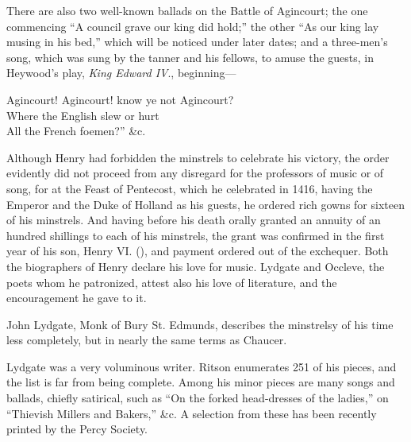 There are also two well-known ballads on the Battle of Agincourt; the one
commencing “A council grave our king did hold;” the other “As our king lay
musing in his bed,” which will be noticed under later dates; and a three-men’s
song, which was sung by the tanner and his fellows, to amuse the guests, in
Heywood’s play, \textit{King Edward IV}., beginning—

\settowidth{\versewidth}{Agincourt! Agincourt! know ye not Agincourt?}
\begin{scverse}Agincourt! Agincourt! know ye not Agincourt?\\
Where the English slew or hurt\\
\vin All the French foemen?” \&c.
\end{scverse}

Although Henry had forbidden the minstrels to celebrate his victory, the order
evidently did not proceed from any disregard for the professors of music or of
song, for at the Feast of Pentecost, which he celebrated in 1416, having the
Emperor and the Duke of Holland as his guests, he ordered rich gowns for sixteen 
of his minstrels. And having before his \pagebreak 
 death orally granted an annuity of an 
hundred shillings to each of his minstrels, the grant was confirmed in the first
year of his son, Henry VI. (), and payment ordered out of the exchequer.
Both the biographers of Henry declare his love for music. %
Lydgate
and Occleve, the poets whom he patronized, attest also his love of literature, and
the encouragement he gave to it.

John Lydgate, Monk of Bury St. Edmunds, describes the minstrelsy of his
time less completely, but in nearly the same terms as Chaucer.

Lydgate was a very voluminous writer. Ritson enumerates 251 of his pieces,
and the list is far from being complete. Among his minor pieces are many songs
and ballads, chiefly satirical, such as “On the forked head-dresses of the ladies,”
on “Thievish Millers and Bakers,” \&c. A selection from these has been recently
printed by the Percy Society.

